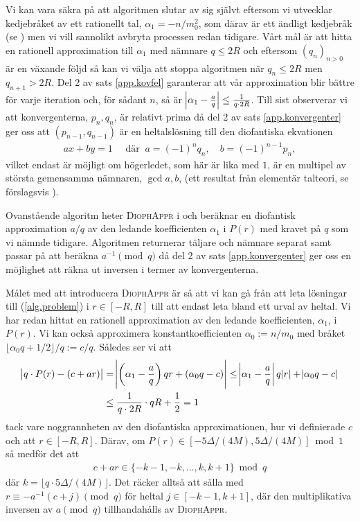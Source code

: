 Vi kan vara säkra på att algoritmen slutar av sig självt eftersom vi utvecklar kedjebråket av ett rationellt tal, \(\alpha_1 = - n / m_0^2\), som därav är ett ändligt kedjebråk (se \cite[sats 21.5]{Lindahl}) men vi vill sannolikt avbryta processen redan tidigare. Vårt mål är att hitta en rationell approximation till \(\alpha_1\) med nämnare \(q \leq 2R\) och eftersom \((q_n)_{n>0}\) är en växande följd så kan vi välja att stoppa algoritmen när \(q_n \leq 2 R\) men \(q_{n + 1} > 2R\). Del 2 av sats \ref{app.kovfel} garanterar att vår approximation blir bättre för varje iteration och, för sådant $n$, så är \(\abs{\alpha_1 - \frac{a}{q}} \leq \frac{1}{q \cdot 2R}\). Till sist observerar vi att konvergenterna, \(p_n, q_n\), är relativt prima då del 2 av sats \ref{app.konvergenter} ger oss att \((p_{n-1}, q_{n-1})\) är en heltalslösning till den diofantiska ekvationen
\begin{align*}
    a x + b y = 1 \quad \text{ där }\ a = (-1)^{n} q_n, \quad b = (-1)^{n-1} p_n,
\end{align*}
vilket endast är möjligt om högerledet, som här är lika med \(1\), är en multipel av största gemensamma nämnaren, \(\gcd{a,b}\), (ett resultat från elementär talteori, se förslagsvis \cite[sats 3.1]{Lindahl}). 

Ovanstående algoritm heter \textsc{DiophAppr} i \cite{HaraldSieve} och beräknar en diofantisk approximation \(a / q\) av den ledande koefficienten \(\alpha_1\) i \(P(r)\) med kravet på $q$ som vi nämnde tidigare. Algoritmen returnerar täljare och nämnare separat samt passar på att beräkna \(a^{-1} \pmod{q}\) då del 2 av sats \ref{app.konvergenter} ger oss en möjlighet att räkna ut inversen i termer av konvergenterna. 

Målet med att introducera \textsc{DiophAppr} är så att vi kan gå från att leta lösningar till (\ref{alg.problem}) i \(r \in [-R, R]\) till att endast leta bland ett urval av heltal. Vi har redan hittat en rationell approximation av den ledande koefficienten, \(\alpha_1\), i \(P(r)\). Vi kan också approximera konstantkoefficienten \(\alpha_0 := n / m_0\) med bråket \(\lfloor \alpha_0 q + 1/2 \rfloor / q := c / q\). Således ser vi att
\begin{align*}
    \abs{q \cdot P(r) - (c + ar)} &= \abs{\left(\alpha_1 - \frac{a}{q}\right) q r + \left( \alpha_0 q - c\right)} \leq 
    \abs{\alpha_1 - \frac{a}{q}} q \abs{r} + \abs{\alpha_0 q - c} \\
    &\leq \frac{1}{q \cdot 2R} \cdot qR + \frac{1}{2}  = 1
\end{align*}
tack vare noggrannheten av den diofantiska approximationen, hur vi definierade \(c\) och att \(r \in [-R, R]\). Därav, om \(P(r) \in [-5\Delta/(4M), 5\Delta/(4M)] \bmod 1\) så medför det att
\begin{align*}
    c + ar \in \{- k - 1, - k, ... , k, k + 1\} \bmod q
\end{align*}
där \(k = \lfloor q \cdot 5\Delta/(4M) \rfloor\). Det räcker alltså att sålla med \(r \equiv - a^{-1} (c + j) \pmod{q}\) för heltal \(j \in [-k-1, k+1]\), där den multiplikativa inversen av $a \pmod{q}$ tillhandahålls av \textsc{DiophAppr}. 

